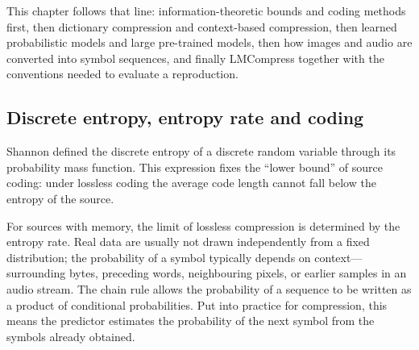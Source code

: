 \documentclass[12pt,a4paper]{article}
\begin{document}
This chapter follows that line: information-theoretic bounds and coding methods first, then
dictionary compression and context-based compression, then learned probabilistic models and
large pre-trained models, then how images and audio are converted into symbol sequences, and
finally LMCompress together with the conventions needed to evaluate a reproduction.

\subsection{Discrete entropy, entropy rate and coding}

Shannon defined the discrete entropy of a discrete random variable through its probability
mass function. This expression fixes the ``lower bound'' of source coding: under lossless
coding the average code length cannot fall below the entropy of the source.

For sources with memory, the limit of lossless compression is determined by the entropy
rate. Real data are usually not drawn independently from a fixed distribution; the
probability of a symbol typically depends on context---surrounding bytes, preceding words,
neighbouring pixels, or earlier samples in an audio stream. The chain rule allows the
probability of a sequence to be written as a product of conditional probabilities. Put into
practice for compression, this means the predictor estimates the probability of the next
symbol from the symbols already obtained.
\end{document}
